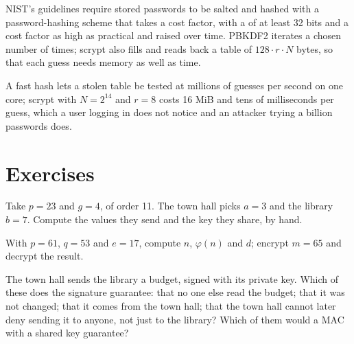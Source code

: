 NIST's guidelines require stored passwords to be salted and hashed with a password-hashing scheme that takes a cost factor, with a  of at least 32 bits and a cost factor as high as practical and raised over time. PBKDF2 iterates  a chosen number of times; scrypt also fills and reads back a table of $128 \cdot r \cdot N$ bytes, so that each guess needs memory as well as time. %

\label{lst:b3:public-key-cryptography:passwords}

\label{out:b3:public-key-cryptography:passwords}

A fast hash lets a stolen table be tested at millions of guesses per second on one core; scrypt with $N = 2^{14}$ and $r = 8$ costs 16 MiB and tens of milliseconds per guess, which a user logging in does not notice and an attacker trying a billion passwords does.

\section{Exercises}\label{sec:b3:public-key-cryptography:exercises}

\begin{exercise}[$\star$]\label{exo:b3:public-key-cryptography:1}
Take $p = 23$ and $g = 4$, of order 11. The town hall picks $a = 3$ and the library $b = 7$. Compute the values they send and the key they share, by hand.
\end{exercise}

\begin{exercise}[$\star$]\label{exo:b3:public-key-cryptography:2}
With $p = 61$, $q = 53$ and $e = 17$, compute $n$, $\varphi(n)$ and $d$; encrypt $m = 65$ and decrypt the result.
\end{exercise}

\begin{exercise}[$\star$]\label{exo:b3:public-key-cryptography:3}
The town hall sends the library a budget, signed with its private key. Which of these does the signature guarantee: that no one else read the budget; that it was not changed; that it comes from the town hall; that the town hall cannot later deny sending it to anyone, not just to the library? Which of them would a MAC with a shared key guarantee?
\end{exercise}

